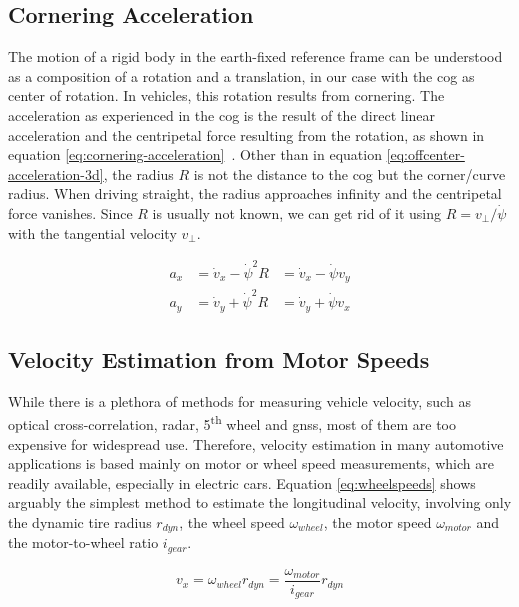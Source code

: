 \subsection{Cornering Acceleration}
The motion of a rigid body in the earth-fixed reference frame can be understood as a composition of a rotation and a translation, in our case with the \gls{cog} as center of rotation. In vehicles, this rotation results from cornering. The acceleration as experienced in the \gls{cog} is the result of the direct linear acceleration and the centripetal force resulting from the rotation, as shown in equation \ref{eq:cornering-acceleration}~\cite[p.~146]{Milliken.1996}. Other than in equation \ref{eq:offcenter-acceleration-3d}, the radius $R$ is not the distance to the \gls{cog} but the corner/curve radius. When driving straight, the radius approaches infinity and the centripetal force vanishes. Since $R$ is usually not known, we can get rid of it using $R = v_{\perp} / \dot{\psi}$ with the tangential velocity $v_{\perp}$.

\begin{subequations}\label{eq:cornering-acceleration}
\begin{alignat}{3}%
a_x &= \dot{v}_x - \dot{\psi}^2 R &= \dot{v}_x - \dot{\psi}v_y \\%
a_y &= \dot{v}_y + \dot{\psi}^2 R &= \dot{v}_y + \dot{\psi}v_x%
\end{alignat}
\end{subequations}


\subsection{Velocity Estimation from Motor Speeds}
While there is a plethora of methods for measuring vehicle velocity, such as optical cross-correlation, radar, 5\textsuperscript{th} wheel and \gls{gnss}, most of them are too expensive for widespread use. Therefore, velocity estimation in many automotive applications is based mainly on motor or wheel speed measurements, which are readily available, especially in electric cars. Equation \ref{eq:wheelspeeds} shows arguably the simplest method to estimate the longitudinal velocity, involving only the dynamic tire radius $r_{dyn}$, the wheel speed $\omega_{wheel}$, the motor speed $\omega_{motor}$ and the motor-to-wheel ratio $i_{gear}$.

\begin{equation}\label{eq:wheelspeeds}%
v_x = \omega_{wheel} r_{dyn} = \frac{\omega_{motor}}{i_{gear}} r_{dyn}%
\end{equation}


